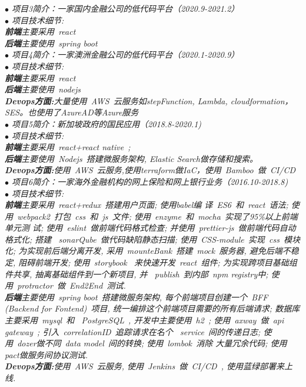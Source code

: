 \documentclass[a3paper,12pt,final]{memoir}
\begin{document}
\begin{CJK*}{UTF8}{gbsn}
\textit{$\bullet$ 项目3简介：一家国内金融公司的低代码平台（2020.9-2021.2）} \\
\textit{$\bullet$ 项目技术细节: \\\textbf{前端}主要采用~react~ \\
  \textbf{后端}主要使用~spring boot~ }\\


\textit{$\bullet$ 项目4简介：一家澳洲金融公司的低代码平台（2020.1-2020.9）} \\
\textit{$\bullet$ 项目技术细节: \\\textbf{前端}主要采用~react~ \\
  \textbf{后端}主要使用~nodejs~ \\
  \textbf{Devops方面:}大量使用~AWS~云服务如stepFunction, Lambda, cloudformation，SES。也使用了AzureAD等Azure服务} \\


\textit{$\bullet$ 项目5简介：新加坡政府的国民应用（2018.8-2020.1)} \\
\textit{$\bullet$ 项目技术细节: \\\textbf{前端}主要采用~react+react native~; \\
  \textbf{后端}主要使用~Nodejs~搭建微服务架构, Elastic Search做存储和搜索。\\
  \textbf{Devops方面:}使用~AWS~云服务,使用terraform做IaC，使用~Bamboo~做~CI/CD~} \\


\textit{$\bullet$ 项目6简介：一家海外金融机构的网上保险和网上银行业务（2016.10-2018.8)} \\
\textit{$\bullet$ 项目技术细节: \\\textbf{前端}主要采用~react+redux~搭建用户页面; 使用babel编
  译~ES6~和~react~语法; 使用~webpack2~打包~css~和~js~文件; 使用~enzyme~和~mocha~实现了95\%以上前端单元测
  试; 使用~eslint~做前端代码格式检查; 并使用~prettier-js~做前端代码自动格式化; 搭建
  ~sonarQube~做代码缺陷静态扫描; 使用~CSS-module~实现~css~模块化; 为实现前后端分离开发,
  采用~mounteBank~搭建~mock~服务器, 避免后端不稳定, 阻碍前端开发; 使用~storybook~
  来快速开发~react~组件; 为实现跨项目基础组件共享, 抽离基础组件到一个新项目, 并
  ~publish~到内部~npm registry中; 使用~protractor~做~End2End~测试.\\
  \textbf{后端}主要使用~spring boot~搭建微服务架构, 每个前端项目创建一个~BFF (Backend for
  Fontend)~项目, 统一编排这个前端项目需要的所有后端请求; 数据库主要采用~mysql~和
  ~PostgreSQL~, 开发中主要使用~h2~; 使用~axway~做~api gateway~; 引入~correlationID~追踪请求在名个
  ~service~间的传递日志; 使用~dozer做不同~data model~间的转换; 使用~lombok~消除
  大量冗余代码; 使用pact做服务间协议测试. \\
  \textbf{Devops方面:}使用~AWS~云服务, 使用~Jenkins~做~CI/CD~, 使用蓝绿部署来上线.} \\


\end{CJK*}
\end{document}
